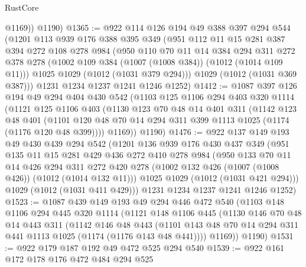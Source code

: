 \begin{lexlean}{RustCore}
\begin{coremodule}
          @1169))
      @1190)
@1365 := @922
    @114
    @126
    @194
    @49
    @388
    @397
    @294
    @544
    (@1201
      @113
      @939
      @176
      @388
      @395
      @349
      (@951
        @112
        @11
        @15
        @281
        @387
        @394
        @272
        @108
        @278
        @984
        (@950
          @110
          @70
          @11
          @14
          @384
          @294
          @311
          @272
          @378
          @278
          (@1002 @109 @384 (@1007 (@1008 @384)) (@1012 (@1014 @109 @11)))
          @1025
          @1029
          (@1012 (@1031 @379 @294)))
        @1029
        (@1012 (@1031 @369 @387)))
      @1231
      @1234
      @1237
      @1241
      @1246
      @1252)
@1412 := @1087
    @397
    @126
    @194
    @49
    @294
    @404
    @430
    @542
    (@1103
      @125
      @1106
      @294
      @403
      @320
      @1114
      (@1121
        @125
        @1106
        @403
        (@1130
          @123
          @70
          @48
          @14
          @401
          @311
          (@1142
            @123
            @48
            @401
            (@1101 @120 @48 @70 @14 @294 @311 @399 @1113 @1025 (@1174 (@1176 @120 @48 @399))))
          @1169))
      @1190)
@1476 := @922
    @137
    @149
    @193
    @49
    @430
    @439
    @294
    @542
    (@1201
      @136
      @939
      @176
      @430
      @437
      @349
      (@951
        @135
        @11
        @15
        @281
        @429
        @436
        @272
        @410
        @278
        @984
        (@950
          @133
          @70
          @11
          @14
          @426
          @294
          @311
          @272
          @420
          @278
          (@1002 @132 @426 (@1007 (@1008 @426)) (@1012 (@1014 @132 @11)))
          @1025
          @1029
          (@1012 (@1031 @421 @294)))
        @1029
        (@1012 (@1031 @411 @429)))
      @1231
      @1234
      @1237
      @1241
      @1246
      @1252)
@1523 := @1087
    @439
    @149
    @193
    @49
    @294
    @446
    @472
    @540
    (@1103
      @148
      @1106
      @294
      @445
      @320
      @1114
      (@1121
        @148
        @1106
        @445
        (@1130
          @146
          @70
          @48
          @14
          @443
          @311
          (@1142
            @146
            @48
            @443
            (@1101 @143 @48 @70 @14 @294 @311 @441 @1113 @1025 (@1174 (@1176 @143 @48 @441))))
          @1169))
      @1190)
@1531 := @922 @179 @187 @192 @49 @472 @525 @294 @540
@1539 := @922 @161 @172 @178 @176 @472 @484 @294 @525

\end{coremodule}
\end{lexlean}
